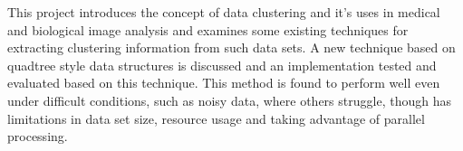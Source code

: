 This project introduces the concept of data clustering and it's uses in medical
and biological image analysis and examines some existing techniques for
extracting clustering information from such data sets. A new technique based on
quadtree style data structures is discussed and an implementation tested and
evaluated based on this technique. This method is found to perform well even
under difficult conditions, such as noisy data, where others struggle, though
has limitations in data set size, resource usage and taking advantage of
parallel processing.

\restoregeometry

\clearpage

\thispagestyle{empty}
\tableofcontents
{}
\thispagestyle{empty}
\listoffigures
{}
\thispagestyle{empty}
\listoftables
{}
\thispagestyle{empty}
\lstlistoflistings%
\thispagestyle{empty}

\restoregeometry
\clearpage
{}
